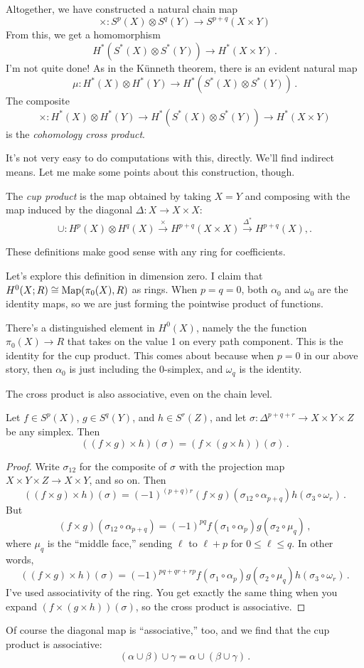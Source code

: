 Altogether, we have constructed a natural chain map
\[
\times:S^p(X)\otimes S^q(Y)\to S^{p+q}(X\times Y)
\]
From this, we get a homomorphism
\[
H^\ast(S^\ast(X)\otimes S^\ast(Y))\to H^\ast(X\times Y)\,.
\]
I'm not quite done! As in the K\"unneth theorem, there is an evident natural 
map 
\[
\mu: H^\ast(X)\otimes H^\ast(Y)\to H^\ast(S^\ast(X)\otimes S^\ast(Y))\,.
\] 
The composite
\[
\times:H^\ast(X)\otimes H^\ast(Y)\to H^\ast(S^\ast(X)\otimes S^\ast(Y))\to H^\ast(X\times Y)
\]
 is the {\em cohomology cross product}.

It's not very easy to do computations with this, directly. We'll find indirect means. Let me make some points about this construction, though.
\begin{definition}
The {\em cup product} is the map obtained by taking $X=Y$ and composing with
the map induced by the diagonal $\Delta:X\to X\times X$:
\[
\cup:H^p(X)\otimes H^q(X)\xrightarrow{\times} H^{p+q}(X\times X)\xrightarrow{\Delta^\ast} H^{p+q}(X),.
\]
\end{definition}
These definitions make good sense with any ring for coefficients.

Let's explore this definition in dimension zero. 
I claim that $ H^0(X;R)\cong\operatorname{Map}(\pi_0(X),R)$ as rings. When $p=q=0$, both $\alpha_0$ and $\omega_0$ are the identity maps, so we are just forming the 
pointwise product of functions. 

There's a distinguished element in $H^0(X)$, namely the the function $\pi_0(X)\to R$ that takes on the value 1 on every path component. 
This is the identity for the cup product. This comes about because when $p=0$ in our above story, then $\alpha_0$ is just including the $0$-simplex, and $\omega_q$ is the identity. 

The cross product is also associative, even on the chain level. 
\begin{prop}
Let $f\in S^p(X)$, $g\in S^q(Y)$, and $h\in S^r(Z)$, and let 
$\sigma:\Delta^{p+q+r}\to X\times Y\times Z$ be any simplex. Then
\[
((f\times g)\times h)(\sigma)=(f\times(g\times h))(\sigma)\,.
\]
\end{prop}
\begin{proof}
Write $\sigma_{12}$ for the composite of $\sigma$ with the projection map
$X\times Y\times Z\to X\times Y$, and so on. Then
\[
((f\times g)\times h)(\sigma)=(-1)^{(p+q)r}
(f\times g)(\sigma_{12}\circ\alpha_{p+q})h(\sigma_3\circ\omega_r)\,.
\]
But 
\[(f\times g)(\sigma_{12}\circ\alpha_{p+q})=(-1)^{pq}
f(\sigma_1\circ\alpha_p)g(\sigma_2\circ\mu_q)\,,
\] 
where $\mu_q$ is the ``middle face,'' sending $\ell$ to $\ell+p$ for
$0\leq\ell\leq q$. In other words, 
\[
((f\times g)\times h)(\sigma)=(-1)^{pq+qr+rp}
f(\sigma_1\circ\alpha_p)g(\sigma_2\circ\mu_q)h(\sigma_3\circ\omega_r)\,.
\]
I've used associativity of the ring. You get exactly the same thing when
you expand $(f\times(g\times h))(\sigma)$, so the cross product is associative.
\end{proof}

Of course the diagonal map is ``associative,'' too, and we find that the
cup product is associative:
\[
(\alpha\cup\beta)\cup\gamma=\alpha\cup(\beta\cup\gamma)\,.
\]

